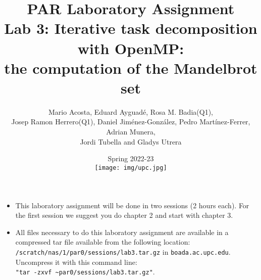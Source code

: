 \documentclass[a4paper]{report}
\begin{document}
\title{PAR Laboratory Assignment \\ Lab 3: Iterative task decomposition with OpenMP: \\ the computation of the Mandelbrot set}
\author{Mario Acosta, Eduard Ayguad\'e, Rosa M. Badia(Q1), \\ Josep Ramon Herrero(Q1), Daniel Jim\'enez-Gonz\'alez, Pedro Martínez-Ferrer, Adrian Munera,\\ Jordi Tubella and Gladys Utrera}
\date{Spring 2022-23 \\ \vspace{14cm} \texttt{[image: img/upc.jpg]}}

\maketitle

\newcommand{\omp} {\emph{OpenMP}\xspace}
\newcommand{\xtrae} {\emph{Extrae}\xspace}
\newcommand{\prver} {\emph{Paraver}\xspace}
\newcommand{\tareador} {\emph{Tareador}\xspace}
\newcommand{\make} {\texttt{Makefile}\xspace}

\renewcommand{\contentsname}{Index}
\tableofcontents
{}

\vspace{5cm}
\begin{itemize}
\item This laboratory assignment will be done in two sessions (2 hours each). For the first session we suggest you do chapter 2 and start with chapter 3.
\item All files necessary to do this laboratory assignment are available in a compressed tar file available from the following location: \texttt{/scratch/nas/1/par0/sessions/lab3.tar.gz} in \texttt{boada.ac.upc.edu}.
Uncompress it with this command line:\\
\texttt{"tar -zxvf \textasciitilde{}par0/sessions/lab3.tar.gz"}.
\end{itemize}

\renewcommand{\chaptername}{}



%
\end{document}
